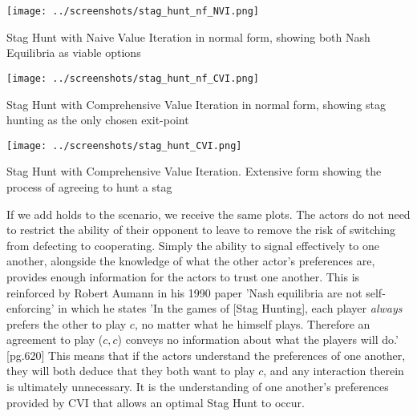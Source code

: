 \begin{fig}[H]
  \begin{minipage}[b]{1.0\linewidth}
    \centering
    \centerline{\texttt{[image: ../screenshots/stag\_hunt\_nf\_NVI.png]}}
    \caption{Stag Hunt with Naive Value Iteration in normal form, showing both Nash Equilibria as viable options}\medskip\label{SHNVI}
  \end{minipage}
\end{fig}

\begin{fig}[H]
  \begin{minipage}[b]{1.0\linewidth}
    \centering
    \centerline{\texttt{[image: ../screenshots/stag\_hunt\_nf\_CVI.png]}}
    \caption{Stag Hunt with Comprehensive Value Iteration in normal form, showing stag hunting as the only chosen exit-point}\medskip\label{SHNFCVI}
  \end{minipage}
\end{fig}

\begin{fig}[H]
  \begin{minipage}[b]{1.0\linewidth}
    \centering
    \centerline{\texttt{[image: ../screenshots/stag\_hunt\_CVI.png]}}
    \caption{Stag Hunt with Comprehensive Value Iteration. Extensive form showing the process of agreeing to hunt a stag}\medskip\label{SHCVI}
  \end{minipage}
\end{fig}

If we add holds to the scenario, we receive the same plots. The actors do not need to restrict the ability of their opponent to leave to remove the risk of switching from defecting to cooperating. Simply the ability to signal effectively to one another, alongside the knowledge of what the other actor's preferences are, provides enough information for the actors to trust one another. This is reinforced by Robert Aumann in his 1990 paper 'Nash equilibria are not self-enforcing' \cite{aumann1990nash} in which he states 'In the games of [Stag Hunting], each player \textit{always} prefers the other to play $c$, no matter what he himself plays. Therefore an agreement to play ($c,c$) conveys no information about what the players will do.' [pg.620] This means that if the actors understand the preferences of one another, they will both deduce that they both want to play $c$, and any interaction therein is ultimately unnecessary. It is the understanding of one another's preferences provided by CVI that allows an optimal Stag Hunt to occur.

